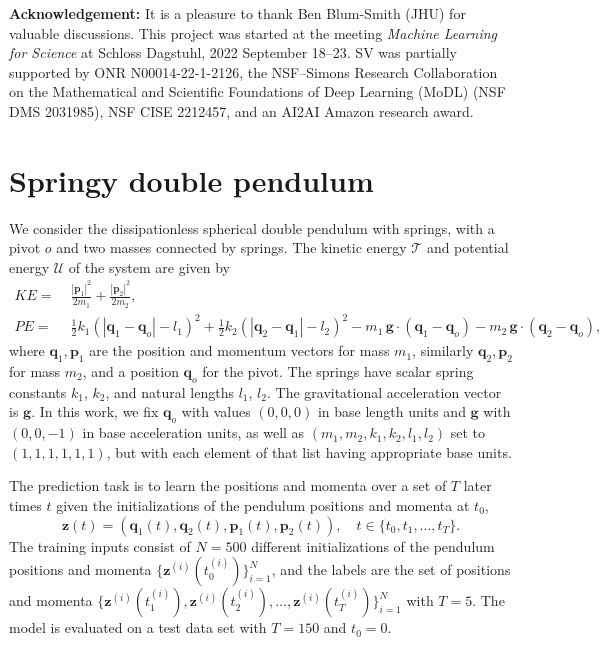 \documentclass{article}
\theoremstyle{plain}
\theoremstyle{definition}
\theoremstyle{remark}
\begin{document}
\textbf{Acknowledgement:}
It is a pleasure to thank Ben Blum-Smith (JHU) for valuable discussions.
This project was started at the meeting \textit{Machine Learning for Science} at Schloss Dagstuhl, 2022 September 18--23.
SV was partially supported by
ONR N00014-22-1-2126, 
the NSF–Simons Research Collaboration on the Mathematical and Scientific Foundations of Deep Learning
(MoDL) (NSF DMS 2031985),
NSF CISE 2212457,
and
an AI2AI Amazon research award.

{\raggedright


}

\appendix\onecolumn
\section{Springy double pendulum}\label{app:pendulum}

We consider the dissipationless spherical double pendulum with springs, with a pivot $o$ and two masses connected by springs. The kinetic energy $\mathcal{T}$ and potential energy $\mathcal{U}$ of the system are given by
\begin{align}
    KE =&\;\frac{|\mathbf{p}_1|^2}{2m_1} +\frac{|\mathbf{p}_2|^2}{2m_2}, \label{eq:energy_T}\\
    PE =&\;\frac12 k_1(|\mathbf{q}_1-\mathbf{q}_o|-l_1)^2 + \frac12 k_2(|\mathbf{q}_2-\mathbf{q}_1|-l_2)^2 
    -m_1\,\mathbf{g}\cdot (\mathbf{q}_1-\mathbf{q}_o)- m_2 \,\mathbf{g}\cdot  (\mathbf{q}_2-\mathbf{q}_o), \label{eq:energy_U}
\end{align}
where $\mathbf{q}_1, \mathbf{p}_1$ are the position and momentum vectors for mass $m_1$, similarly $\mathbf{q}_2, \mathbf{p}_2$ for mass $m_2$, and a position $\mathbf{q}_o$ for the pivot. The springs have scalar spring constants $k_1$, $k_2$, and natural lengths $l_1$, $l_2$. The gravitational acceleration vector is $\mathbf{g}$. 
In this work, we fix $\mathbf{q}_o$ with values $(0,0,0)$ in base length units and $\mathbf{g}$ with $(0,0,-1)$ in base acceleration units, as well as $(m_1, m_2, k_1, k_2, l_1, l_2)$ set to $(1,1,1,1,1,1)$, but with each element of that list having appropriate base units. 

The prediction task is to learn the positions and momenta over a set of $T$ later times $t$ given the initializations of the pendulum positions and momenta at $t_0$,
\begin{equation}
\mathbf{z}(t)=(\mathbf{q}_1(t),\mathbf{q}_2(t),\mathbf{p}_1(t),\mathbf{p}_2(t)), \quad t\in\{t_0, t_1,\ldots,t_T\}. 
\end{equation}
The training inputs consist of $N=500$ different initializations of the pendulum positions and momenta $\{\mathbf{z}^{(i)}(t_0^{(i)})\}_{i=1}^N$, and the labels are the set of positions and momenta $\{\mathbf{z}^{(i)}(t_1^{(i)}),\mathbf{z}^{(i)}(t_2^{(i)}),\ldots,\mathbf{z}^{(i)}(t_T^{(i)})\}_{i=1}^N$ with $T=5$.
The model is evaluated on a test data set with $T=150$ and $t_0=0$. 
\end{document}
